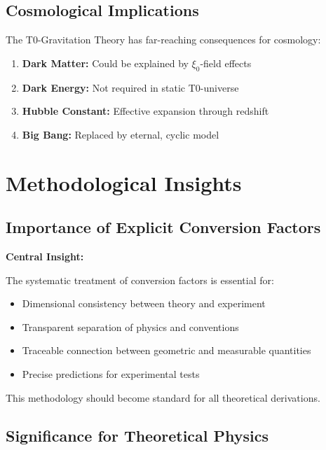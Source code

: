 \documentclass[12pt,a4paper]{article}
\begin{document}
	\subsection{Cosmological Implications}
	
	The T0-Gravitation Theory has far-reaching consequences for cosmology:
	
	\begin{enumerate}
		\item \textbf{Dark Matter:} Could be explained by $\xi_0$-field effects
		\item \textbf{Dark Energy:} Not required in static T0-universe
		\item \textbf{Hubble Constant:} Effective expansion through redshift
		\item \textbf{Big Bang:} Replaced by eternal, cyclic model
	\end{enumerate}
	
	
	
	\section{Methodological Insights}
	
	\subsection{Importance of Explicit Conversion Factors}
	
	\begin{keyresult}
		\textbf{Central Insight:}
		
		The systematic treatment of conversion factors is essential for:
		\begin{itemize}
			\item Dimensional consistency between theory and experiment
			\item Transparent separation of physics and conventions
			\item Traceable connection between geometric and measurable quantities
			\item Precise predictions for experimental tests
		\end{itemize}
		
		This methodology should become standard for all theoretical derivations.
	\end{keyresult}
	
	\subsection{Significance for Theoretical Physics}
	
\end{document}
